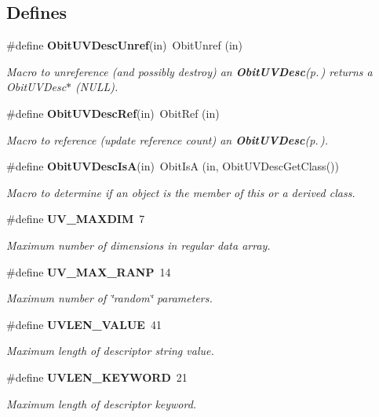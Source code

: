 \subsection*{Defines}
\begin{CompactItemize}
\item 
\#define {\bf Obit\-UVDesc\-Unref}(in)\ Obit\-Unref (in)
\begin{CompactList}\small\item\em Macro to unreference (and possibly destroy) an {\bf Obit\-UVDesc}{\rm (p.\,\pageref{structObitUVDesc})} returns a Obit\-UVDesc$\ast$ (NULL). \item\end{CompactList}\item 
\#define {\bf Obit\-UVDesc\-Ref}(in)\ Obit\-Ref (in)
\begin{CompactList}\small\item\em Macro to reference (update reference count) an {\bf Obit\-UVDesc}{\rm (p.\,\pageref{structObitUVDesc})}. \item\end{CompactList}\item 
\#define {\bf Obit\-UVDesc\-Is\-A}(in)\ Obit\-Is\-A (in, Obit\-UVDesc\-Get\-Class())
\begin{CompactList}\small\item\em Macro to determine if an object is the member of this or a derived class. \item\end{CompactList}\item 
\#define {\bf UV\_\-MAXDIM}\ 7
\begin{CompactList}\small\item\em Maximum number of dimensions in regular data array. \item\end{CompactList}\item 
\#define {\bf UV\_\-MAX\_\-RANP}\ 14
\begin{CompactList}\small\item\em Maximum number of \char`\"{}random\char`\"{} parameters. \item\end{CompactList}\item 
\#define {\bf UVLEN\_\-VALUE}\ 41
\begin{CompactList}\small\item\em Maximum length of descriptor string value. \item\end{CompactList}\item 
\#define {\bf UVLEN\_\-KEYWORD}\ 21
\begin{CompactList}\small\item\em Maximum length of descriptor keyword. \item\end{CompactList}\end{CompactItemize}
